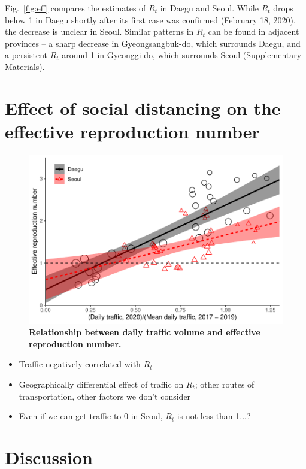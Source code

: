 \documentclass[12pt]{article}
\newcommand{\fref}[1]{Fig.~\ref{fig:#1}}
\begin{document}
\fref{eff} compares the estimates of $R_t$ in Daegu and Seoul.
While $R_t$ drops below 1 in Daegu shortly after its first case was confirmed (February 18, 2020), 
the decrease is unclear in Seoul.
Similar patterns in $R_t$ can be found in adjacent provinces -- a sharp decrease in Gyeongsangbuk-do, which surrounds Daegu, and a persistent $R_t$ around 1 in Gyeonggi-do, which surrounds Seoul (Supplementary Materials).

\section{Effect of social distancing on the effective reproduction number}

\begin{figure}[!ht]
\includegraphics[width=\textwidth]{figure_traffic_regression.pdf}
\caption{
\textbf{Relationship between daily traffic volume and effective reproduction number.}
}
\label{fig:traffic}
\end{figure}

\begin{itemize}
  \item Traffic negatively correlated with $R_t$
  \item Geographically differential effect of traffic on $R_t$; other routes of transportation, other factors we don't consider
  \item Even if we can get traffic to 0 in Seoul, $R_t$ is not less than 1...?
\end{itemize}

\section{Discussion}
\end{document}
